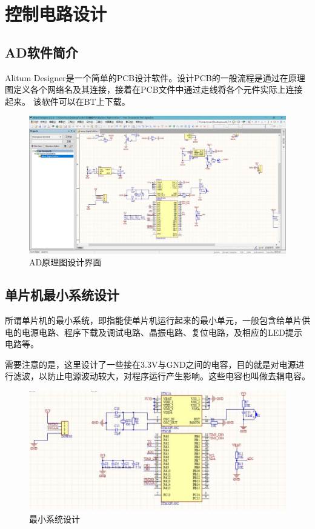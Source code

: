 \documentclass{article}
\begin{document}
\section{控制电路设计}
\subsection{AD软件简介}
Alitum Designer是一个简单的PCB设计软件。设计PCB的一般流程是通过在原理图定义各个网络名及其连接，接着在PCB文件中通过走线将各个元件实际上连接起来。
该软件可以在BT上下载。

\begin{figure}[htb]
	\centering
	\includegraphics[scale=0.25]{AD界面.jpg}
	\caption{AD原理图设计界面}
	\label{fig:label}
\end{figure}

\subsection{单片机最小系统设计}
所谓单片机的最小系统，即指能使单片机运行起来的最小单元，一般包含给单片供电的电源电路、程序下载及调试电路、晶振电路、复位电路，及相应的LED提示电路等。

需要注意的是，这里设计了一些接在3.3V与GND之间的电容，目的就是对电源进行滤波，以防止电源波动较大，对程序运行产生影响。这些电容也叫做去耦电容。

\begin{figure}[ht]
	\centering
	\includegraphics[scale=0.5]{最小系统.jpg}
	\caption{最小系统设计}
	\label{fig:label}
\end{figure}
\end{document}
